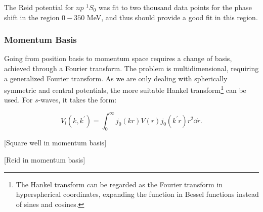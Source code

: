 The Reid potential for \(np\) \(^{1}S_{0}\) was fit to two thousand data points
for the phase shift in the region \(0-350\) MeV, and thus should provide a good
fit in this region.

\subsubsection{Momentum Basis}

Going from position basis to momentum space requires a change of basis, achieved
through a Fourier transform. The problem is multidimensional, requiring a
generalized Fourier transform. As we are only dealing with spherically symmetric
and central potentials, the more suitable Hankel transform\footnote{The Hankel
  transform can be regarded as the Fourier transform in hyperspherical coordinates, expanding the function in
Bessel functions instead of sines and cosines. } can be used. For
\(s\)-waves, it takes the form:

\newcommand{\kp}{k^{\prime}}
\begin{equation*}
  V_{l}(k, \kp{}) = \int_{0}^{\infty}j_{0}(kr)V(r)j_{0}(k^{\prime}r)r^{2}\dd r .
\end{equation*}


[Square well in momentum basis]

[Reid in momentum basis]




